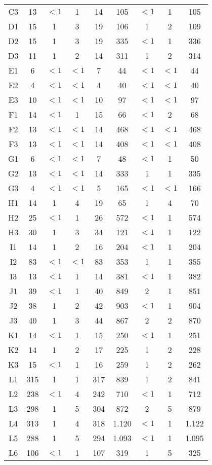 \begin{center}
\begin{longtable}{ccccc|cccc}
C3&13&$<1$&1&14&105&$<1$&1&105\\
D1&15&1&3&19&106&1&2&109\\
D2&15&1&3&19&335&$<1$&1&336\\
D3&11&1&2&14&311&1&2&314\\
E1&6&$<1$&$<1$&7&44&$<1$&$<1$&44\\
E2&4&$<1$&$<1$&4&40&$<1$&$<1$&40\\
E3&10&$<1$&$<1$&10&97&$<1$&$<1$&97\\
F1&14&$<1$&1&15&66&$<1$&2&68\\
F2&13&$<1$&$<1$&14&468&$<1$&$<1$&468\\
F3&13&$<1$&$<1$&14&408&$<1$&$<1$&408\\
G1&6&$<1$&$<1$&7&48&$<1$&1&50\\
G2&13&$<1$&$<1$&14&333&1&1&335\\
G3&4&$<1$&$<1$&5&165&$<1$&$<1$&166\\
H1&14&1&4&19&65&1&4&70\\
H2&25&$<1$&1&26&572&$<1$&1&574\\
H3&30&1&3&34&121&$<1$&1&122\\
I1&14&1&2&16&204&$<1$&1&204\\
I2&83&$<1$&$<1$&83&353&1&1&355\\
I3&13&$<1$&1&14&381&$<1$&1&382\\
J1&39&$<1$&1&40&849&2&1&851\\
J2&38&1&2&42&903&$<1$&1&904\\
J3&40&1&3&44&867&2&2&870\\
K1&14&$<1$&1&15&250&$<1$&1&251\\
K2&14&1&2&17&225&1&2&228\\
K3&15&$<1$&1&16&259&1&2&262\\
L1&315&1&1&317&839&1&2&841\\
L2&238&$<1$&4&242&710&$<1$&1&712\\
L3&298&1&5&304&872&2&5&879\\
L4&313&1&4&318&1.120&$<1$&1&1.122\\
L5&288&1&5&294&1.093&$<1$&1&1.095\\
L6&106&$<1$&1&107&319&1&5&325\\
\end{longtable}
\end{center}

